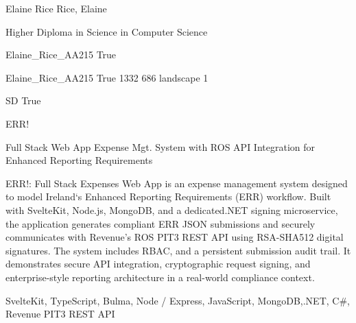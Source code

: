 
\begingroup{}\relax



\def\Key{Elaine_Rice_AA215}

{Elaine Rice}
{Rice, Elaine}

{Higher Diploma in Science in Computer Science}

{Elaine_Rice_AA215}
{True}

{Elaine_Rice_AA215}
{True}
{1332}
{686}
{landscape}
{1}

{SD}
{True}

{ERR!}

{Full Stack Web App Expense Mgt. System with ROS API Integration for Enhanced Reporting Requirements}

{ERR!: Full Stack Expenses Web App is an expense management system designed to model Ireland\textquoteleft{}s Enhanced Reporting Requirements (ERR) workflow. Built with SvelteKit, Node.js, MongoDB, and a dedicated.NET signing microservice, the application generates compliant ERR JSON submissions and securely communicates with Revenue\textquoteright{}s ROS PIT3 REST API using RSA-SHA512 digital signatures. The system includes RBAC, and a persistent submission audit trail. It demonstrates secure API integration, cryptographic request signing, and enterprise-style reporting architecture in a real-world compliance context.}

{SvelteKit, TypeScript, Bulma, Node / Express, JavaScript, MongoDB,.NET, C\#, Revenue PIT3 REST API}


